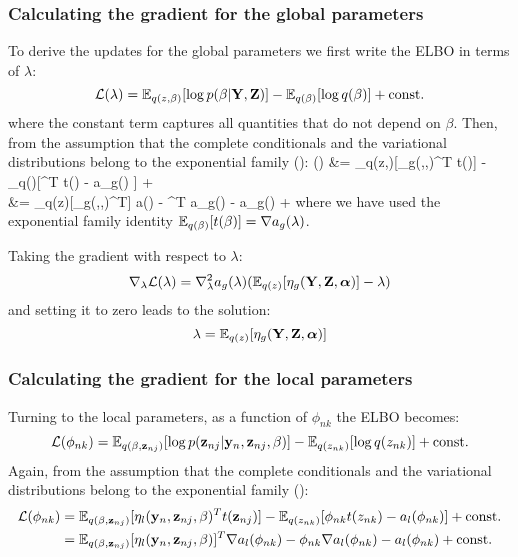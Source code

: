 \subsubsection{Calculating the gradient for the global parameters}

To derive the updates for the global parameters we first write the ELBO in terms of $\lambda$:
\[
	\mathcal{L}(\lambda) = \mathbb{E}_{q(z,\beta)}[\log p(\beta|{\bf Y},{\bf Z})] - \mathbb{E}_{q(\beta)}[\log q(\beta)] + {\rm const.}
\]
where the constant term captures all quantities that do not depend on $\beta$. Then, from the assumption that the complete conditionals and the variational distributions belong to the exponential family ():
\baln
	\Lagr(\lambda) &= \E_{q(z,\beta)}[\eta_g(\bfY,\bfZ,\balpha)^T t(\beta)] - \E_{q(\beta)}[\lambda^T t(\beta) - a_g(\lambda) ] + \const \\
	&= \E_{q(z)}[\eta_g(\bfY,\bfZ,\balpha)^T] \nabla a(\lambda) - \lambda^T \nabla a_g(\lambda) - a_g(\lambda) + \const
\ealn
where we have used the exponential family identity $\mathbb{E}_{q(\beta)}[t(\beta)] = \nabla a_g(\lambda)$.

Taking the gradient with respect to $\lambda$:
\begin{equation} \label{gradient_global}
	\nabla_{\lambda} \mathcal{L}(\lambda) = \nabla_{\lambda}^{2} a_g(\lambda)(\mathbb{E}_{q(z)}[\eta_g({\bf Y},{\bf Z},\mbox{\boldmath $\alpha$})] - \lambda)
\end{equation}
and setting it to zero leads to the solution:
\begin{equation} \label{solution_global}
	\lambda = \mathbb{E}_{q(z)}[\eta_g({\bf Y},{\bf Z},\mbox{\boldmath $\alpha$})]
\end{equation}


\subsubsection{Calculating the gradient for the local parameters}

Turning to the local parameters, as a function of $\phi_{nk}$ the ELBO becomes:
\[
	\mathcal{L}(\phi_{nk}) = \mathbb{E}_{q(\beta,{\bf z}_{nj})}[\log p({\bf z}_{nj}|{\bf y}_{n},{\bf z}_{nj}, \beta)] - \mathbb{E}_{q(z_{nk})}[\log q(z_{nk})] + {\rm const.}
\]
Again, from the assumption that the complete conditionals and the variational distributions belong to the exponential family ():
\begin{align*}
	\mathcal{L}(\phi_{nk}) &= \mathbb{E}_{q(\beta,{\bf z}_{nj})}[\eta_l({\bf y}_n,{\bf z}_{nj},\beta)^T t({\bf z}_{nj})] - \mathbb{E}_{q(z_{nk})}[\phi_{nk} t(z_{nk}) - a_l(\phi_{nk}) ] + {\rm const.} \\
	&= \mathbb{E}_{q(\beta,{\bf z}_{nj})}[\eta_l({\bf y}_n,{\bf z}_{nj},\beta)]^T \nabla a_l(\phi_{nk}) - \phi_{nk} \nabla a_l(\phi_{nk}) - a_l(\phi_{nk}) + {\rm const.}
\end{align*}

